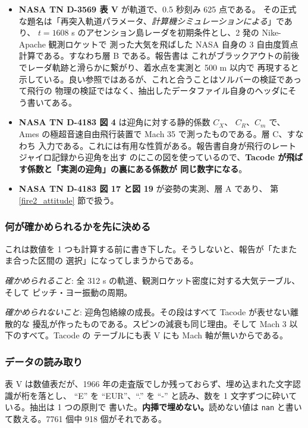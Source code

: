 \documentclass[11pt,a4paper,dvipdfmx]{jsarticle}
\begin{document}
\begin{itemize}
\item \textbf{NASA TN D-3569 表 V} \cite{Lewis1966} が軌道で、0.5 秒刻み 625 点である。
その正式な題名は「再突入軌道パラメータ、\emph{計算機シミュレーションによる}」であり、
$t = 1608$ s のアセンション島レーダを初期条件とし、2 発の Nike-Apache 観測ロケットで
測った大気を飛ばした NASA 自身の 3 自由度質点計算である。すなわち層 B である。報告書は
これがブラックアウトの前後でレーダ軌跡と滑らかに繋がり、着水点を実測と 500 m 以内で
再現すると示している。良い参照ではあるが、これと合うことはソルバーの検証であって飛行の
物理の検証ではなく、抽出したデータファイル自身のヘッダにそう書いてある。
\item \textbf{NASA TN D-4183 図 4} \cite{Scallion1967} は迎角に対する静的係数 $C_X$、
$C_R$、$C_m$ で、Ames の極超音速自由飛行装置で Mach 35 で測ったものである。層 C、すなわち
入力である。これには有用な性質がある。報告書自身が飛行のレートジャイロ記録から迎角を出す
のにこの図を使っているので、\textbf{Tacode が飛ばす係数と「実測の迎角」の裏にある係数が
同じ数字になる}。
\item \textbf{NASA TN D-4183 図 17 と図 19} が姿勢の実測、層 A であり、
第 \ref{fire2_attitude} 節で扱う。
\end{itemize}

\subsubsection{何が確かめられるかを先に決める}

これは数値を 1 つも計算する前に書き下した。そうしないと、報告が「たまたま合った区間の
選択」になってしまうからである。

\emph{確かめられること}: 全 312 s の軌道、観測ロケット密度に対する大気テーブル、そして
ピッチ・ヨー振動の周期。

\emph{確かめられないこと}: 迎角包絡線の成長。その段はすべて Tacode が表せない離散的な
擾乱が作ったものである。スピンの減衰も同じ理由。そして Mach 3 以下のすべて。Tacode の
テーブルにも表 V にも Mach 軸が無いからである。

\subsubsection{データの読み取り}

表 V は数値表だが、1966 年の走査版でしか残っておらず、埋め込まれた文字認識が桁を落とし、
``E'' を ``EUR''、``.'' を ``-'' と読み、数を 1 文字ずつに砕いている。抽出は 1 つの原則で
書いた。\textbf{内挿で埋めない。}読めない値は \texttt{nan} と書いて数える。7761 個中
918 個がそれである。
\end{document}

